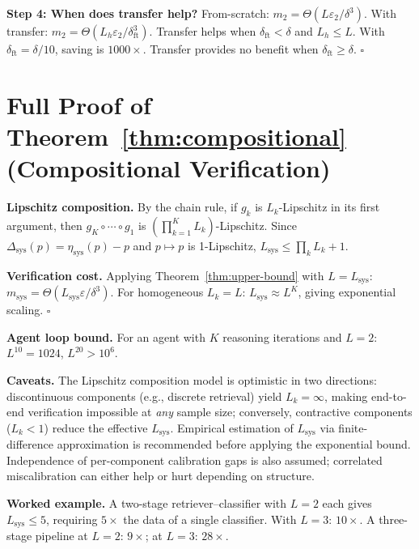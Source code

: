 \documentclass{article}
\newcommand{\Lip}{L}
\newcommand{\errrate}{\varepsilon}
\newcommand{\nsamples}{m}
\newcommand{\calmapraw}{\eta}
\newcommand{\calmap}{\Delta}
\newcommand{\ftshift}{\delta_{\mathrm{ft}}}
\newcommand{\Liph}{L_h}
\newcommand{\targetacc}{\delta}
\newcommand{\recalround}{K}
\newcommand{\Lsystem}{L_{\mathrm{sys}}}
\newcommand{\Lcomp}{L_k}
\theoremstyle{definition}
\begin{document}
\textbf{Step 4: When does transfer help?}
From-scratch: $\nsamples_2 = \Theta(\Lip \errrate_2 / \delta^3)$. With transfer: $\nsamples_2 = \Theta(\Liph \errrate_2 / \ftshift^3)$. Transfer helps when $\ftshift < \delta$ and $\Liph \leq \Lip$. With $\ftshift = \delta/10$, saving is $1000\times$. Transfer provides no benefit when $\ftshift \geq \delta$. $\square$

\section{Full Proof of Theorem~\ref{thm:compositional} (Compositional Verification)}
\label{app:compositional}

\textbf{Lipschitz composition.} By the chain rule, if $g_k$ is $L_k$-Lipschitz in its first argument, then $g_\recalround \circ \cdots \circ g_1$ is $(\prod_{k=1}^{\recalround} L_k)$-Lipschitz. Since $\calmap_{\mathrm{sys}}(p) = \calmapraw_{\mathrm{sys}}(p) - p$ and $p \mapsto p$ is 1-Lipschitz, $\Lsystem \leq \prod_k L_k + 1$.

\textbf{Verification cost.} Applying Theorem~\ref{thm:upper-bound} with $\Lip = \Lsystem$: $\nsamples_{\mathrm{sys}} = \Theta(\Lsystem \errrate/\targetacc^3)$. For homogeneous $L_k = \Lip$: $\Lsystem \approx \Lip^\recalround$, giving exponential scaling. $\square$

\textbf{Agent loop bound.} For an agent with $\recalround$ reasoning iterations and $\Lip = 2$: $\Lip^{10} = 1024$, $\Lip^{20} > 10^6$.

\textbf{Caveats.} The Lipschitz composition model is optimistic in two directions: discontinuous components (e.g., discrete retrieval) yield $\Lcomp = \infty$, making end-to-end verification impossible at \emph{any} sample size; conversely, contractive components ($L_k < 1$) reduce the effective $\Lsystem$. Empirical estimation of $\Lsystem$ via finite-difference approximation is recommended before applying the exponential bound. Independence of per-component calibration gaps is also assumed; correlated miscalibration can either help or hurt depending on structure.

\textbf{Worked example.} A two-stage retriever--classifier with $\Lip = 2$ each gives $\Lsystem \leq 5$, requiring $5\times$ the data of a single classifier. With $\Lip = 3$: $10\times$. A three-stage pipeline at $\Lip = 2$: $9\times$; at $\Lip = 3$: $28\times$.
\end{document}
